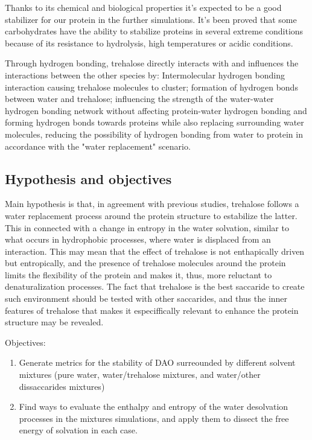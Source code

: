 \documentclass[a4paper]{article}
\begin{document}
Thanks to its chemical and biological properties it's expected to be a good stabilizer for our protein in the further simulations. It's been proved that some carbohydrates have the ability to stabilize proteins in several extreme conditions because of its resistance to hydrolysis, high temperatures or acidic conditions\cite{shao_trehalose_2019}.

Through hydrogen bonding, trehalose directly interacts with and influences the interactions between the other species by: Intermolecular hydrogen bonding interaction causing trehalose molecules to cluster; formation of hydrogen bonds between water and trehalose; influencing the strength of the water-water hydrogen bonding network without affecting protein-water hydrogen bonding and forming hydrogen bonds towards proteins while also replacing surrounding water molecules, reducing the possibility of hydrogen bonding from water to protein in accordance with the "water replacement" scenario.


	\subsection{Hypothesis and objectives}
	\label{sec:hypobj}
	
	Main hypothesis is that, in agreement with previous studies, trehalose follows a water replacement process around the protein structure to estabilize the latter. This in connected with a change in entropy in the water solvation, similar to what occurs in hydrophobic processes, where water is displaced from an interaction. This may mean that the effect of trehalose is not enthapically driven but entropically, and the presence of trehalose molecules around the protein limits the flexibility of the protein and makes it, thus, more reluctant to denaturalization processes. The fact that trehalose is the best saccaride to create such environment should be tested with other saccarides, and thus the inner features of trehalose that makes it especiffically relevant to enhance the protein structure may be revealed.

	Objectives:

	\begin{enumerate}
		\item Generate metrics for the stability of DAO surreounded by different solvent mixtures (pure water, water/trehalose mixtures, and water/other dissaccarides mixtures)
		\item Find ways to evaluate the enthalpy and entropy of the water desolvation processes in the mixtures simulations, and apply them to dissect the free energy of solvation in each case.
	\end{enumerate}
	
\end{document}
